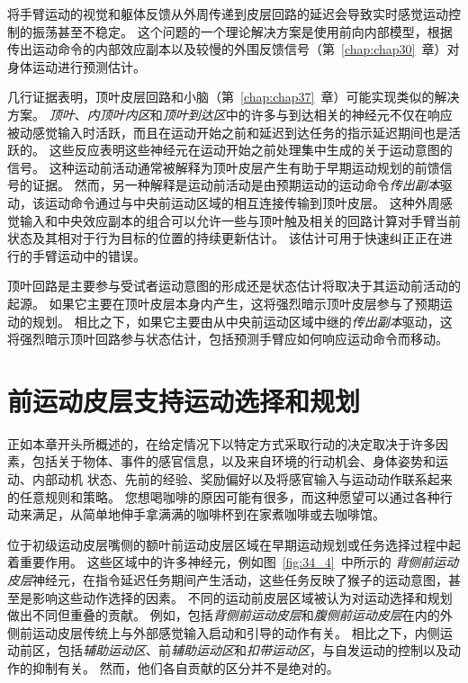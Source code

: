 将手臂运动的视觉和躯体反馈从外周传递到皮层回路的延迟会导致实时感觉运动控制的振荡甚至不稳定。
这个问题的一个理论解决方案是使用前向内部模型，根据传出运动命令的内部效应副本以及较慢的外围反馈信号（第~\ref{chap:chap30}~章）对身体运动进行预测估计。


几行证据表明，顶叶皮层回路和小脑（第~\ref{chap:chap37}~章）可能实现类似的解决方案。
\textit{顶叶}、\textit{内顶叶内区}和\textit{顶叶到达区}中的许多与到达相关的神经元不仅在响应被动感觉输入时活跃，而且在运动开始之前和延迟到达任务的指示延迟期间也是活跃的。
这些反应表明这些神经元在运动开始之前处理集中生成的关于运动意图的信号。
这种运动前活动通常被解释为顶叶皮层产生有助于早期运动规划的前馈信号的证据。
然而，另一种解释是运动前活动是由预期运动的运动命令\textit{传出副本}驱动，该运动命令通过与中央前运动区域的相互连接传输到顶叶皮层。
这种外周感觉输入和中央效应副本的组合可以允许一些与顶叶触及相关的回路计算对手臂当前状态及其相对于行为目标的位置的持续更新估计。
该估计可用于快速纠正正在进行的手臂运动中的错误。


顶叶回路是主要参与受试者运动意图的形成还是状态估计将取决于其运动前活动的起源。
如果它主要在顶叶皮层本身内产生，这将强烈暗示顶叶皮层参与了预期运动的规划。
相比之下，如果它主要由从中央前运动区域中继的\textit{传出副本}驱动，这将强烈暗示顶叶回路参与状态估计，包括预测手臂应如何响应运动命令而移动。



\section{前运动皮层支持运动选择和规划}

正如本章开头所概述的，在给定情况下以特定方式采取行动的决定取决于许多因素，包括关于物体、事件的感官信息，以及来自环境的行动机会、身体姿势和运动、内部动机 状态、先前的经验、奖励偏好以及将感官输入与运动动作联系起来的任意规则和策略。
您想喝咖啡的原因可能有很多，而这种愿望可以通过各种行动来满足，从简单地伸手拿满满的咖啡杯到在家煮咖啡或去咖啡馆。


位于初级运动皮层嘴侧的额叶前运动皮层区域在早期运动规划或任务选择过程中起着重要作用。
这些区域中的许多神经元，例如图~\ref{fig:34_4}~中所示的 \textit{背侧前运动皮层}神经元，在指令延迟任务期间产生活动，这些任务反映了猴子的运动意图，甚至是影响这些动作选择的因素。
不同的运动前皮层区域被认为对运动选择和规划做出不同但重叠的贡献。
例如，包括\textit{背侧前运动皮层}和\textit{腹侧前运动皮层}在内的外侧前运动皮层传统上与外部感觉输入启动和引导的动作有关。
相比之下，内侧运动前区，包括\textit{辅助运动区}、前\textit{辅助运动区}和\textit{扣带运动区}，与自发运动的控制以及动作的抑制有关。
然而，他们各自贡献的区分并不是绝对的。



